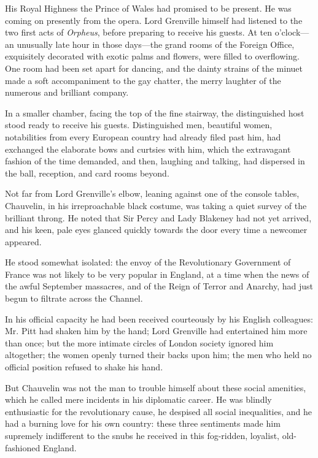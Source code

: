\documentclass[paper=a5,BCOR=7mm,twoside,DIV=calc,12pt,usegeometry,chapterprefix,endperiod,headings=big]{scrbook}
\begin{document}
His Royal Highness the Prince of Wales had promised to be present. He was coming on presently from the opera. Lord Grenville himself had listened to the two first acts of \textit{Orpheus}, before preparing to receive his guests. At ten o'clock---an unusually late hour in those days---the grand rooms of the Foreign Office, exquisitely decorated with exotic palms and flowers, were filled to overflowing. One room had been set apart for dancing, and the dainty strains of the minuet made a soft accompaniment to the gay chatter, the merry laughter of the numerous and brilliant company.

In a smaller chamber, facing the top of the fine stairway, the distinguished host stood ready to receive his guests. Distinguished men, beautiful women, notabilities from every European country had already filed past him, had exchanged the elaborate bows and curtsies with him, which the extravagant fashion of the time demanded, and then, laughing and talking, had dispersed in the ball, reception, and card rooms beyond.

Not far from Lord Grenville's elbow, leaning against one of the console tables, Chauvelin, in his irreproachable black costume, was taking a quiet survey of the brilliant throng. He noted that Sir Percy and Lady Blakeney had not yet arrived, and his keen, pale eyes glanced quickly towards the door every time a newcomer appeared.

He stood somewhat isolated: the envoy of the Revolutionary Government of France was not likely to be very popular in England, at a time when the news of the awful September massacres, and of the Reign of Terror and Anarchy, had just begun to filtrate across the Channel.

In his official capacity he had been received courteously by his English colleagues: Mr. Pitt had shaken him by the hand; Lord Grenville had entertained him more than once; but the more intimate circles of London society ignored him altogether; the women openly turned their backs upon him; the men who held no official position refused to shake his hand.

But Chauvelin was not the man to trouble himself about these social amenities, which he called mere incidents in his diplomatic career. He was blindly enthusiastic for the revolutionary cause, he despised all social inequalities, and he had a burning love for his own country: these three sentiments made him supremely indifferent to the snubs he received in this fog-ridden, loyalist, old-fashioned England.
\end{document}
